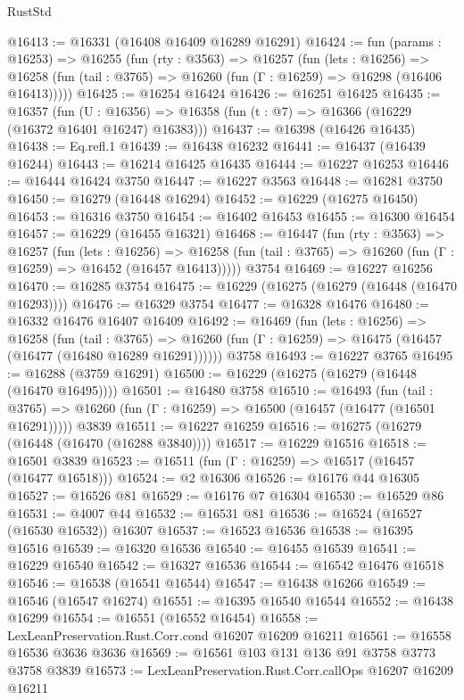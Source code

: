 \begin{lexlean}{RustStd}
\begin{coremodule}
@16413 := @16331 (@16408 @16409 @16289 @16291)
@16424 := fun (params : @16253) =>
  @16255
    (fun (rty : @3563) =>
    @16257
      (fun (lets : @16256) =>
      @16258 (fun (tail : @3765) => @16260 (fun (Γ : @16259) => @16298 (@16406 @16413)))))
@16425 := @16254 @16424
@16426 := @16251 @16425
@16435 := @16357
    (fun (U : @16356) => @16358 (fun (t : @7) => @16366 (@16229 (@16372 @16401 @16247) @16383)))
@16437 := @16398 (@16426 @16435)
@16438 := Eq.refl.{1}
@16439 := @16438 @16232
@16441 := @16437 (@16439 @16244)
@16443 := @16214 @16425 @16435
@16444 := @16227 @16253
@16446 := @16444 @16424 @3750
@16447 := @16227 @3563
@16448 := @16281 @3750
@16450 := @16279 (@16448 @16294)
@16452 := @16229 (@16275 @16450)
@16453 := @16316 @3750
@16454 := @16402 @16453
@16455 := @16300 @16454
@16457 := @16229 (@16455 @16321)
@16468 := @16447
    (fun (rty : @3563) =>
    @16257
      (fun (lets : @16256) =>
      @16258 (fun (tail : @3765) => @16260 (fun (Γ : @16259) => @16452 (@16457 @16413)))))
    @3754
@16469 := @16227 @16256
@16470 := @16285 @3754
@16475 := @16229 (@16275 (@16279 (@16448 (@16470 @16293))))
@16476 := @16329 @3754
@16477 := @16328 @16476
@16480 := @16332 @16476 @16407 @16409
@16492 := @16469
    (fun (lets : @16256) =>
    @16258
      (fun (tail : @3765) =>
      @16260 (fun (Γ : @16259) => @16475 (@16457 (@16477 (@16480 @16289 @16291))))))
    @3758
@16493 := @16227 @3765
@16495 := @16288 (@3759 @16291)
@16500 := @16229 (@16275 (@16279 (@16448 (@16470 @16495))))
@16501 := @16480 @3758
@16510 := @16493
    (fun (tail : @3765) => @16260 (fun (Γ : @16259) => @16500 (@16457 (@16477 (@16501 @16291)))))
    @3839
@16511 := @16227 @16259
@16516 := @16275 (@16279 (@16448 (@16470 (@16288 @3840))))
@16517 := @16229 @16516
@16518 := @16501 @3839
@16523 := @16511 (fun (Γ : @16259) => @16517 (@16457 (@16477 @16518)))
@16524 := @2 @16306
@16526 := @16176 @44 @16305
@16527 := @16526 @81
@16529 := @16176 @7 @16304
@16530 := @16529 @86
@16531 := @4007 @44
@16532 := @16531 @81
@16536 := @16524 (@16527 (@16530 @16532)) @16307
@16537 := @16523 @16536
@16538 := @16395 @16516
@16539 := @16320 @16536
@16540 := @16455 @16539
@16541 := @16229 @16540
@16542 := @16327 @16536
@16544 := @16542 @16476 @16518
@16546 := @16538 (@16541 @16544)
@16547 := @16438 @16266
@16549 := @16546 (@16547 @16274)
@16551 := @16395 @16540 @16544
@16552 := @16438 @16299
@16554 := @16551 (@16552 @16454)
@16558 := LexLeanPreservation.Rust.Corr.cond @16207 @16209 @16211
@16561 := @16558 @16536 @3636 @3636
@16569 := @16561 @103 @131 @136 @91 @3758 @3773 @3758 @3839
@16573 := LexLeanPreservation.Rust.Corr.callOps @16207 @16209 @16211

\end{coremodule}
\end{lexlean}
